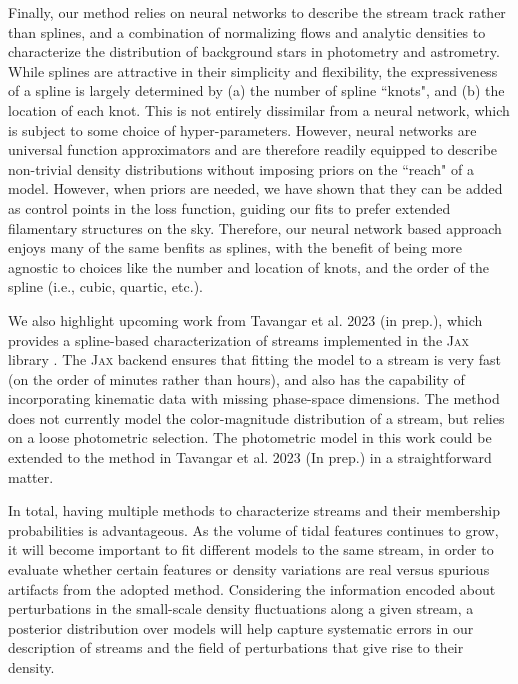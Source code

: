 \documentclass[twocolumn]{aastex631}
\newcommand{\code}[1]{\textsc{#1}}
\newcommand{\package}[1]{\code{#1}}
\begin{document}
        Finally, our method relies on neural networks to describe the stream
        track rather than splines, and a combination of normalizing flows and
        analytic densities to characterize the distribution of background stars
        in photometry and astrometry. While splines are attractive in their
        simplicity and flexibility, the expressiveness of a spline is largely
        determined by (a) the number of spline ``knots", and (b) the location of
        each knot. This is not entirely dissimilar from a neural network, which
        is subject to some choice of hyper-parameters. However, neural networks
        are universal function approximators and are therefore readily equipped
        to describe non-trivial density distributions without imposing priors on
        the ``reach" of a model. However, when priors are needed, we have shown
        that they can be added as control points in the loss function, guiding
        our fits to prefer extended filamentary structures on the sky.
        Therefore, our neural network based approach enjoys many of the same
        benfits as splines, with the benefit of being more agnostic to choices
        like the number and location of knots, and the order of the spline
        (i.e., cubic, quartic, etc.).

        We also highlight upcoming work from Tavangar et al. 2023 (in prep.),
        which provides a spline-based characterization of streams implemented in
        the \package{Jax} library \citep{jax2018github}. The \package{Jax}
        backend ensures that fitting the model to a stream is very fast (on the
        order of minutes rather than hours), and also has the capability of
        incorporating kinematic data with missing phase-space dimensions. The
        method does not currently model the color-magnitude distribution of a
        stream, but relies on a loose photometric selection. The photometric
        model in this work could be extended to the method in Tavangar et al.
        2023 (In prep.) in a straightforward matter. 
        
        
        In total, having multiple methods to characterize streams and their
        membership probabilities is advantageous. As the volume of tidal
        features continues to grow, it will become important to fit different
        models to the same stream, in order to evaluate whether certain features
        or density variations are real versus spurious artifacts from the
        adopted method. Considering the information encoded about perturbations
        in the small-scale density fluctuations along a given stream, a
        posterior distribution over models will help capture systematic errors
        in our description of streams and the field of perturbations that give
        rise to their density.  
    
\end{document}
